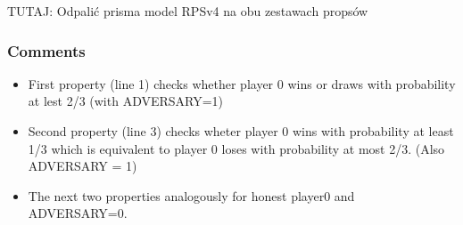 TUTAJ: Odpalić prisma model RPSv4 na obu zestawach propsów





















\subsubsection{Comments}

\begin{itemize}
\item First property (line 1) checks whether player 0 wins or draws with probability at lest 2/3 (with ADVERSARY=1)
\item Second property (line 3) checks wheter player 0 wins with probability at least 1/3 which is equivalent to player 0
loses with probability at most 2/3. (Also ADVERSARY = 1)
\item The next two properties analogously for honest player0 and ADVERSARY=0.
\end{itemize}
